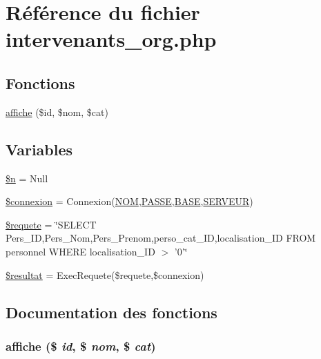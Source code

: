 \hypertarget{intervenants__org_8php}{
\section{R\'{e}f\'{e}rence du fichier intervenants\_\-org.php}
\label{intervenants__org_8php}
}
\subsection*{Fonctions}
\begin{CompactItemize}
\item 
\hyperlink{intervenants__org_8php_a4}{affiche} (\$id, \$nom, \$cat)
\end{CompactItemize}
\subsection*{Variables}
\begin{CompactItemize}
\item 
\hyperlink{intervenants__org_8php_a0}{\$n} = Null
\item 
\hyperlink{intervenants__org_8php_a1}{\$connexion} = Connexion(\hyperlink{pma__connect_8php_a0}{NOM},\hyperlink{pma__connect_8php_a1}{PASSE},\hyperlink{pma__connect_8php_a3}{BASE},\hyperlink{pma__connect_8php_a2}{SERVEUR})
\item 
\hyperlink{intervenants__org_8php_a2}{\$requete} = \char`\"{}SELECT Pers\_\-ID,Pers\_\-Nom,Pers\_\-Prenom,perso\_\-cat\_\-ID,localisation\_\-ID FROM personnel WHERE localisation\_\-ID $>$ '0'\char`\"{}
\item 
\hyperlink{intervenants__org_8php_a3}{\$resultat} = Exec\-Requete(\$requete,\$connexion)
\end{CompactItemize}


\subsection{Documentation des fonctions}
\hypertarget{intervenants__org_8php_a4}{
\subsubsection[affiche]{\setlength{\rightskip}{0pt plus 5cm}affiche (\$ {\em id}, \$ {\em nom}, \$ {\em cat})}}
\label{intervenants__org_8php_a4}





